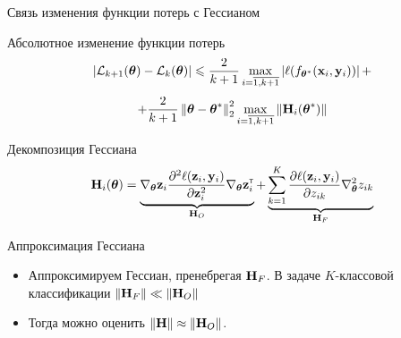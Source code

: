 \documentclass[aspectratio=169]{beamer}
\begin{document}
\begin{frame}{Связь изменения функции потерь с Гессианом}
    \vspace{-0.7em}
    \begin{block}{Абсолютное изменение функции потерь}
        \vspace{-1em}
        \[\left| \mathcal{L}_{k+1}(\boldsymbol{\theta}) - \mathcal{L}_k(\boldsymbol{\theta}) \right| \leqslant \dfrac{2}{k+1}\max\limits_{i=\overline{1,k+1}} \left|\ell(f_{\boldsymbol{\theta}^*}(\mathbf{x}_{i}, \mathbf{y}_{i})) \right| + \]
        \vspace{-1em}
        \[+ \frac{2}{k+1}\left\|\boldsymbol{\theta} - \boldsymbol{\theta}^*\right\|^2_2\max\limits_{i=\overline{1,k+1}}{\left\|\mathbf{H}_{i}(\boldsymbol{\theta}^*)\right\|}\]
    \end{block}
    \vspace{-1em}
    \begin{block}{Декомпозиция Гессиана}
        \vspace{-1em}
        \[
            \mathbf{H}_{i}(\boldsymbol{\theta}) = \underbrace{\nabla_{\boldsymbol{\theta}} \mathbf{z}_i \dfrac{\partial^2 \ell(\mathbf{z}_i, \mathbf{y}_i)}{\partial \mathbf{z}_{i}^2} \nabla_{\boldsymbol{\theta}} \mathbf{z}_i^{\text{\tiny\sffamily\upshape\mdseries T}} }_{\mathbf{H}_O} + \underbrace{\sum\limits_{k=1}^{K} \dfrac{\partial \ell(\mathbf{z}_i, \mathbf{y}_i)}{\partial z_{ik}} \nabla^2_{\boldsymbol{\theta}} z_{ik}}_{\mathbf{H}_F}
        \]
    \end{block}
    \vspace{-2em}
%
%
%        
    \begin{block}{Аппроксимация Гессиана}
    \begin{itemize}
        \item Аппроксимируем Гессиан, пренебрегая $\mathbf{H}_F$. В задаче $K$-классовой классификации $\left\|\mathbf{H}_F\right\|\ll \left\|\mathbf{H}_O\right\|$
        \item Тогда можно оценить $\left\|\mathbf{H}\right\| \approx \left\|\mathbf{H}_O\right\|$.
    \end{itemize}
    \end{block}
\end{frame}
\end{document}
